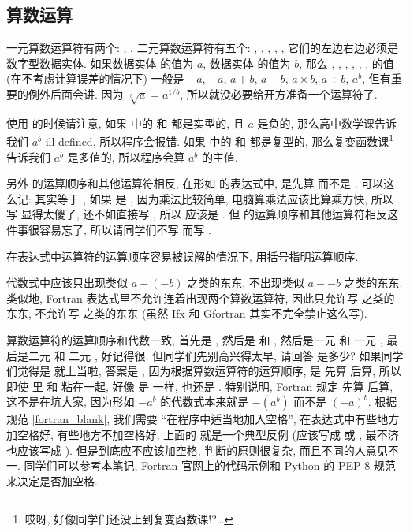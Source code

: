 \subsection{算数运算}\label{fortran_numeric_operator}

一元算数运算符有两个: \ttt{+}, \ttt{-}, 二元算数运算符有五个: \ttt{+}, \ttt{-}, \ttt{*}, \ttt{/}, \ttt{**}, 它们的左边右边必须是数字型数据实体. 如果数据实体 \ttt{[a]} 的值为 $a$, 数据实体 \ttt{[b]} 的值为 $b$, 那么 \ttt{+[a]}, \ttt{-[a]}, \ttt{[a]+[b]}, \ttt{[a]-[b]}, \ttt{[a]*[b]}, \ttt{[a]/[b]}, \ttt{[a]**[b]} 的值 (在不考虑计算误差的情况下) 一般是 $+a$, $-a$, $a+b$, $a-b$, $a\times b$, $a\div b$, $a^b$, 但有重要的例外后面会讲. 因为 $\sqrt[b]{a}=a^{1/b}$, 所以就没必要给开方准备一个运算符了.

使用 \ttt{**} 的时候请注意, 如果 \ttt{[a]**[b]} 中的 \ttt{[a]} 和 \ttt{[b]} 都是实型的, 且 $a$ 是负的, 那么高中数学课告诉我们 $a^b$ ill defined, 所以程序会报错. 如果 \ttt{[a]**[b]} 中的 \ttt{[a]} 和 \ttt{[b]} 都是复型的, 那么复变函数课\footnote{哎呀, 好像同学们还没上到复变函数课!?\dots{}}告诉我们 $a^b$ 是多值的, 所以程序会算 $a^b$ 的主值.

另外 \ttt{**} 的运算顺序和其他运算符相反, 在形如 \ttt{[a]**[b]**[c]} 的表达式中, 是先算 \ttt{[b]**[c]} 而不是 \ttt{[a]**[b]}. 可以这么记: \ttt{([a]**[b])**[c]} 其实等于 \ttt{[a]**([b]*[c])}, 如果 \ttt{[a]**[b]**[c]} 是 \ttt{([a]**[b])**[c]}, 因为乘法比较简单, 电脑算乘法应该比算乘方快, 所以写 \ttt{[a]**[b]**[c]} 显得太傻了, 还不如直接写 \ttt{[a]**([b]*[c])}, 所以 \ttt{[a]**[b]**[c]} 应该是 \ttt{[a]**([b]**[c])}. 但 \ttt{**} 的运算顺序和其他运算符相反这件事很容易忘了, 所以请同学们不写 \ttt{[a]**[b]**[c]} 而写 \ttt{[a]**([b]**[c])}.
\begin{convention}
    在表达式中运算符的运算顺序容易被误解的情况下, 用括号指明运算顺序.
\end{convention}

代数式中应该只出现类似 $a-(-b)$ 之类的东东, 不出现类似 $a--b$ 之类的东东. 类似地, Fortran 表达式里不允许连着出现两个算数运算符, 因此只允许写 \ttt{[a] - (-[b])} 之类的东东, 不允许写 \ttt{[a] - -[b]} 之类的东东 (虽然 Ifx 和 Gfortran 其实不完全禁止这么写).

算数运算符的运算顺序和代数一致, 首先是 \ttt{**}, 然后是 \ttt{*} 和 \ttt{/}, 然后是一元 \ttt{+} 和 一元 \ttt{-}, 最后是二元 \ttt{+} 和 二元 \ttt{-}, 好记得很. 但同学们先别高兴得太早, 请回答  是多少? 如果同学们觉得是  就上当啦, 答案是 , 因为根据算数运算符的运算顺序, 是 \ttt{**} 先算 \ttt{-} 后算, 所以即使  里 \ttt{-} 和  粘在一起, 好像  是  一样,  也还是 . 特别说明, Fortran 规定 \ttt{**} 先算 \ttt{-} 后算, 这不是在坑大家, 因为形如 $-a^b$ 的代数式本来就是 $-(a^b)$ 而不是 $(-a)^b$. 根据规范 \ref{fortran_blank}, 我们需要 ``在程序中适当地加入空格'', 在表达式中有些地方加空格好, 有些地方不加空格好, 上面的  就是一个典型反例 (应该写成  或 , 最不济也应该写成 ). 但是到底应不应该加空格, 判断的原则很复杂, 而且不同的人意见不一. 同学们可以参考本笔记, Fortran \href{https://fortran-lang.org/}{官网}上的代码示例和 Python 的 \href{https://peps.python.org/pep-0008/}{PEP 8 规范}来决定是否加空格.

